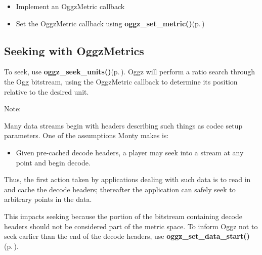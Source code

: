 \begin{itemize}
\item Implement an Oggz\-Metric callback\item Set the Oggz\-Metric callback using {\bf oggz\_\-set\_\-metric()}{\rm (p.\,\pageref{group__seek__api_ga2})}\end{itemize}
\subsection{Seeking with Oggz\-Metrics}\label{using}
To seek, use {\bf oggz\_\-seek\_\-units()}{\rm (p.\,\pageref{group__seek__api_ga4})}. Oggz will perform a ratio search through the Ogg bitstream, using the Oggz\-Metric callback to determine its position relative to the desired unit.

\begin{Desc}
\item[Note:]\end{Desc}
Many data streams begin with headers describing such things as codec setup parameters. One of the assumptions Monty makes is:

\begin{itemize}
\item Given pre-cached decode headers, a player may seek into a stream at any point and begin decode.\end{itemize}


Thus, the first action taken by applications dealing with such data is to read in and cache the decode headers; thereafter the application can safely seek to arbitrary points in the data.

This impacts seeking because the portion of the bitstream containing decode headers should not be considered part of the metric space. To inform Oggz not to seek earlier than the end of the decode headers, use {\bf oggz\_\-set\_\-data\_\-start()}{\rm (p.\,\pageref{group__seek__api_ga6})}. 

